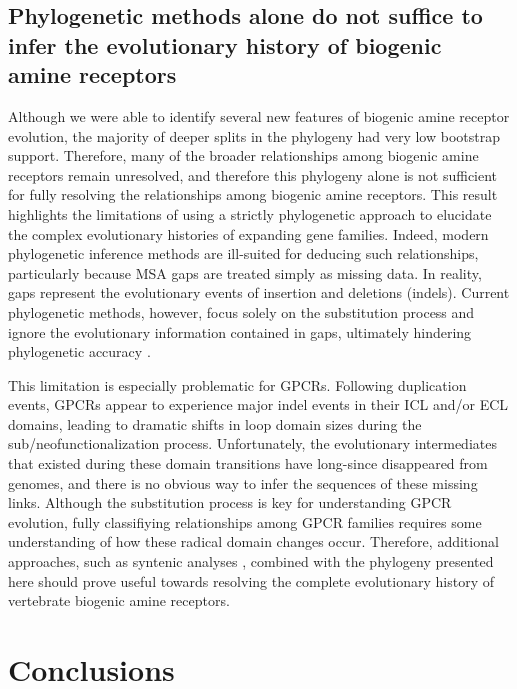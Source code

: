 \documentclass[fleqn,10pt]{wlpeerj}
\begin{document}
\subsection*{Phylogenetic methods alone do not suffice to infer the evolutionary history of biogenic amine receptors}
Although we were able to identify several new features of biogenic amine receptor evolution, the majority of deeper splits in the phylogeny had very low bootstrap support. Therefore, many of the broader relationships among biogenic amine receptors remain unresolved, and therefore this phylogeny alone is not sufficient for fully resolving the relationships among biogenic amine receptors. This result highlights the limitations of using a strictly phylogenetic approach to elucidate the complex evolutionary histories of expanding gene families. Indeed, modern phylogenetic inference methods are ill-suited for deducing such relationships, particularly because MSA gaps are treated simply as missing data. In reality, gaps represent the evolutionary events of insertion and deletions (indels). Current phylogenetic methods, however, focus solely on the substitution process and ignore the evolutionary information contained in gaps, ultimately hindering phylogenetic accuracy \citep{Morrison2008,Loytynoja2008,Warnow2012,Luanetal2013}. 

This limitation is especially problematic for GPCRs. Following duplication events, GPCRs appear to experience major indel events in their ICL and/or ECL domains, leading to dramatic shifts in loop domain sizes during the sub/neofunctionalization process. Unfortunately, the evolutionary intermediates that existed during these domain transitions have long-since disappeared from genomes, and there is no obvious way to infer the sequences of these missing links. Although the substitution process is key for understanding GPCR evolution, fully classifiying relationships among GPCR families requires some understanding of how these radical domain changes occur. Therefore, additional approaches, such as syntenic analyses \citep{Sundstrom2010,Widmark2011,YegorovGood2012,Hwangetal2013}, combined with the phylogeny presented here should prove useful towards resolving the complete evolutionary history of vertebrate biogenic amine receptors. 


\section*{Conclusions}
\end{document}

